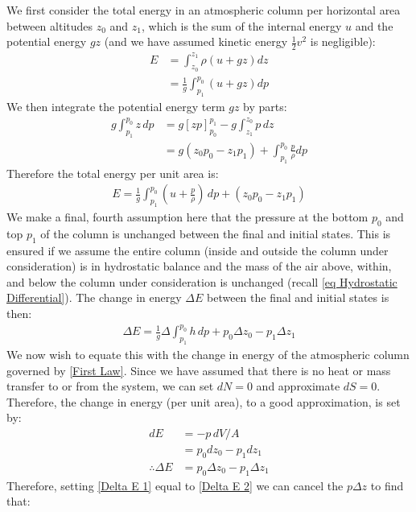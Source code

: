 We first consider the total energy in an atmospheric column per horizontal area between altitudes \(z_0\) and \(z_1\), which is the sum of the internal energy \(u\) and the potential energy \(gz\) (and we have assumed kinetic energy \(\frac{1}{2}v^2\) is negligible):
\begin{align*}
    E &= \int_{z_0}^{z_1} \rho \left( u + gz \right)dz\\
    &=\frac{1}{g}\int_{p_1}^{p_0} \left( u+gz \right)dp
\end{align*}
We then integrate the potential energy term \(gz\) by parts:
\begin{align*}
    g\int_{p_1}^{p_0} z\,dp &= g\left[ zp \right]_{p_0}^{p_1}-g\int_{z_1}^{z_0}p\,dz\\
    &=g(z_0p_0-z_1p_1)+\int_{p_1}^{p_0}\frac{p}{\rho}dp
\end{align*}
Therefore the total energy per unit area is:
\begin{align*}
    E=\frac{1}{g}\int_{p_1}^{p_0}\left(u+\frac{p}{\rho} \right)\,dp+(z_0p_0-z_1p_1)
\end{align*}
We make a final, fourth assumption here that the pressure at the bottom \(p_0\) and top \(p_1\) of the column is unchanged between the final and initial states. This is ensured if we assume the entire column (inside and outside the column under consideration) is in hydrostatic balance and the mass of the air above, within, and below the column under consideration is unchanged (recall \ref{eq Hydrostatic Differential}). The change in energy \(\Delta E\) between the final and initial states is then:
\begin{align}
    \label{Delta E 1}
    \Delta E = \frac{1}{g}\Delta \int_{p_1}^{p_0}h\,dp + p_0 \Delta z_0 - p_1 \Delta z_1
\end{align}
We now wish to equate this with the change in energy of the atmospheric column governed by \ref{First Law}. Since we have assumed that there is no heat or mass transfer to or from the system, we can set \(dN=0\) and approximate \(dS=0\). Therefore, the change in energy (per unit area), to a good approximation, is set by:
\begin{align}
    dE &= -p\,dV/A\nonumber\\
    &=p_0 d z_0-p_1 d z_1\nonumber\\
    \label{Delta E 2}
    \therefore \Delta E & = p_0 \Delta z_0 - p_1 \Delta z_1 
\end{align}
Therefore, setting \ref{Delta E 1} equal to \ref{Delta E 2} we can cancel the \(p\Delta z\) to find that:
